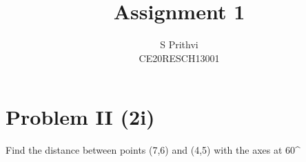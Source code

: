 \documentclass[journal,12pt,twocolumn]{IEEEtran}
\begin{document}
\def\putbox#1#2#3{\makebox[0in][l]{\makebox[#1][l]{}\raisebox{\baselineskip}[0in][0in]{\raisebox{#2}[0in][0in]{#3}}}}
     \def\rightbox#1{\makebox[0in][r]{#1}}
     \def\centbox#1{\makebox[0in]{#1}}
     \def\topbox#1{\raisebox{-\baselineskip}[0in][0in]{#1}}
     \def\midbox#1{\raisebox{-0.5\baselineskip}[0in][0in]{#1}}
\vspace{3cm}
\title{Assignment 1}
\author{S Prithvi \\ CE20RESCH13001}
\maketitle
\newpage
\bigskip
\renewcommand{\thefigure}{\theenumi}
\renewcommand{\thetable}{\theenumi}
\section*{Problem II (2\Large{i})}
Find the distance between points (7,6) and (4,5) with the axes at 60^{\circ}
\end{document}
